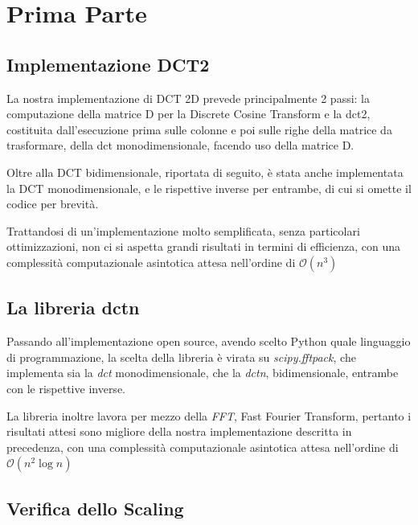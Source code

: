 \section{Prima Parte}

\subsection{Implementazione DCT2}

La nostra implementazione di DCT 2D prevede principalmente 2 passi: la computazione della matrice D per la Discrete Cosine Transform e la dct2, costituita dall'esecuzione prima sulle colonne e poi sulle righe della matrice da trasformare, della dct monodimensionale, facendo uso della matrice D.



Oltre alla DCT bidimensionale, riportata di seguito, è stata anche implementata la DCT monodimensionale, e le rispettive inverse per entrambe, di cui si omette il codice per brevità.



Trattandosi di un'implementazione molto semplificata, senza particolari ottimizzazioni, non ci si aspetta grandi risultati in termini di efficienza, con una complessità computazionale asintotica attesa nell'ordine di $\mathcal{O}(n^3)$

\subsection{La libreria dctn}

Passando all'implementazione open source, avendo scelto Python quale linguaggio di programmazione, la scelta della libreria è virata su \textit{scipy.fftpack}, che implementa sia la \textit{dct} monodimensionale, che la \textit{dctn}, bidimensionale, entrambe con le rispettive inverse.

La libreria inoltre lavora per mezzo della \textit{FFT}, Fast Fourier Transform, pertanto i risultati attesi sono migliore della nostra implementazione descritta in precedenza, con una complessità computazionale asintotica attesa nell'ordine di $\mathcal{O}(n^2\log{}n)$

\subsection{Verifica dello Scaling}

